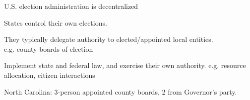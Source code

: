 \documentclass[xcolor=dvipsnames, 11pt, table]{beamer}
\begin{document}
\begin{frame}{U.S. election administration is decentralized}

	\pause
	States control their own elections.

	\pause
	\vspace*{.25in}
	They typically delegate authority to elected/appointed local entities.  \\
	\hspace*{.2in} {\color{gray} \footnotesize e.g. county boards of election}\\ \normalsize

	\pause
	\vspace*{.25in}
	Implement state and federal law, and exercise their own authority.
	\hspace*{.2in} {\color{gray} \footnotesize e.g. resource allocation, citizen interactions}\\ \normalsize

	\pause
	\vspace*{.25in}
	North Carolina: 3-person appointed county boards, 2 from Governor's party.



\end{frame}


























\end{document}
